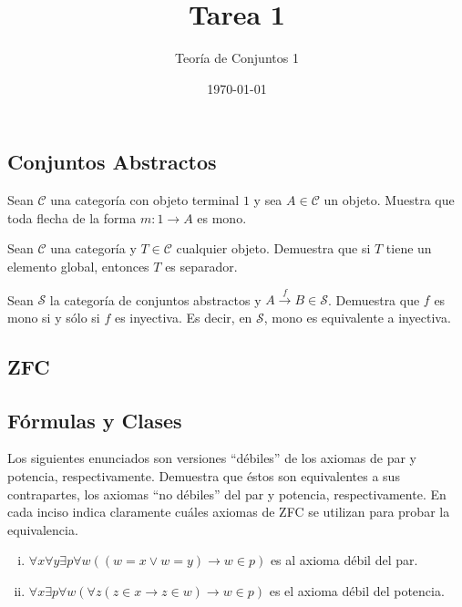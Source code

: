 \documentclass[10pt]{article}
\title{Tarea 1}
\author{Teoría de Conjuntos 1}
\date{\today}
\newcommand{\topos}[1]{\mathcal{#1}}
\begin{document}
    \maketitle

    \begin{flushright}
        \section*{Conjuntos Abstractos}
    \end{flushright}
    \begin{exercise}
        Sean \(\topos{C}\) una categoría con objeto terminal $1$ y sea \(A \in \topos{C}\) un objeto. Muestra que toda flecha de la forma \(m:1\to A\) es mono.
    \end{exercise}

    \begin{exercise}
        Sean \(\topos{C}\) una categoría y \(T \in \topos{C}\) cualquier objeto. Demuestra que si \(T\) tiene un elemento global, entonces \(T\) es separador.
    \end{exercise}

    \begin{exercise}
        Sean \(\topos{S}\) la categoría de conjuntos abstractos y \(A \xrightarrow{f} B \in \topos{S}\). Demuestra que $f$ es mono si y sólo si $f$ es inyectiva. Es decir, en \(\topos{S}\), mono es equivalente a inyectiva. 
    \end{exercise}


    \newpage
    \begin{flushright}
        \section*{ZFC}
        \subsection*{Fórmulas y Clases}
    \end{flushright}
    \begin{exercise}
        Los siguientes enunciados son versiones ``débiles'' de los axiomas de par y potencia, respectivamente. Demuestra que éstos son equivalentes a sus contrapartes, los axiomas ``no débiles'' del par y potencia, respectivamente. En cada inciso indica claramente cuáles axiomas de ZFC se utilizan para probar la equivalencia.
        \begin{enumerate}[i)]
            \item \(\forall x \forall y \exists p \forall w ( (w=x \lor w=y) \to w \in p ) \) es al axioma débil del par.
            \item \(\forall x \exists p \forall w ( \forall z ( z \in x \to z \in w) \rightarrow w \in p )\) es el axioma débil del potencia.
        \end{enumerate}
    \end{exercise}
\end{document}
